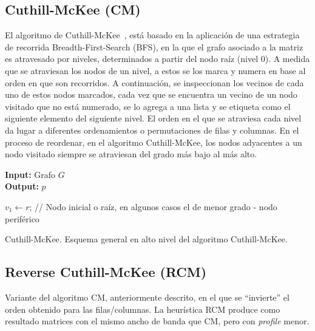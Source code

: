  \subsection{Cuthill-McKee (CM)}\label{CM}

El algoritmo de Cuthill-McKee~\cite{Cuthill-Mckee}, está basado en la aplicación de una estrategia de recorrida Breadth-First-Search (BFS), en la que el grafo asociado a la matriz es atravesado por niveles, determinados a partir del nodo raíz (nivel 0). A medida que se atraviesan los nodos de un nivel, a estos se los marca y numera en base al orden en que son recorridos. A continuación, se inspeccionan los vecinos de cada uno de estos nodos marcados, cada vez que se encuentra un vecino de un nodo visitado que no está numerado, se lo agrega a una lista y se etiqueta como el siguiente elemento del siguiente nivel. El orden en el que se atraviesa cada nivel da lugar a diferentes ordenamientos o permutaciones de filas y columnas. En el proceso de reordenar, en el algoritmo Cuthill-McKee, los nodos adyacentes a un nodo visitado siempre se atraviesan del grado más bajo al más alto.


\begin{algorithm}[]
\textbf{Input:} Grafo $G$ \\
\textbf{Output:} $p$



 $v_1 \leftarrow r$; // Nodo inicial o raíz, en algunos casos el de menor grado - nodo periférico  \
 
 \caption{Cuthill-McKee. Esquema general en alto nivel del algoritmo Cuthill-McKee.}
 \label{alg:cm}
\end{algorithm}

\subsection{Reverse Cuthill-McKee (RCM)}\label{RCM}
Variante del algoritmo CM, anteriormente descrito, en el que se ``invierte'' el orden obtenido para las filas/columnas.
La heurística RCM produce como resultado matrices con el mismo ancho de banda que CM, pero con \textit{profile} menor.

